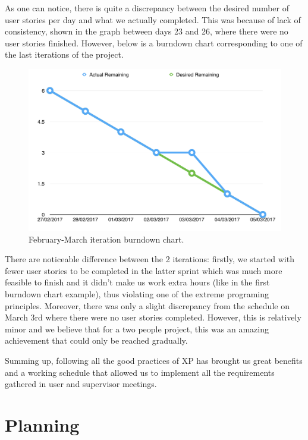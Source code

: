 \documentclass{l4proj}
\begin{document}
As one can notice, there is quite a discrepancy between the desired number of user stories per day and what we actually
completed. This was because of lack of consistency, shown in the graph between days 23 and 26, where there were no user
stories finished. However, below is a burndown chart corresponding to one of the last iterations of the project.

\pagebreak

\begin{figure}[!ht]
\centering
\includegraphics[scale=0.6]{recent-burndown}
\caption{February-March iteration burndown chart.}
\label{fig:burndown-february}
\end{figure}

There are noticeable difference between the 2 iterations: firstly, we started with fewer user stories to be completed in the latter sprint which was much more feasible to finish and it didn't make us work extra hours (like in the first burndown chart example), thus violating one of the extreme programing principles. Moreover, there was only a slight discrepancy from the schedule on March 3rd where there were no user stories completed. However, this is relatively minor and we believe that for a two people project, this was an amazing achievement that could only be reached gradually.

Summing up, following all the good practices of XP has brought us great benefits and a working schedule that allowed us to implement all the requirements gathered in user and supervisor meetings.

\section{Planning}
\end{document}
